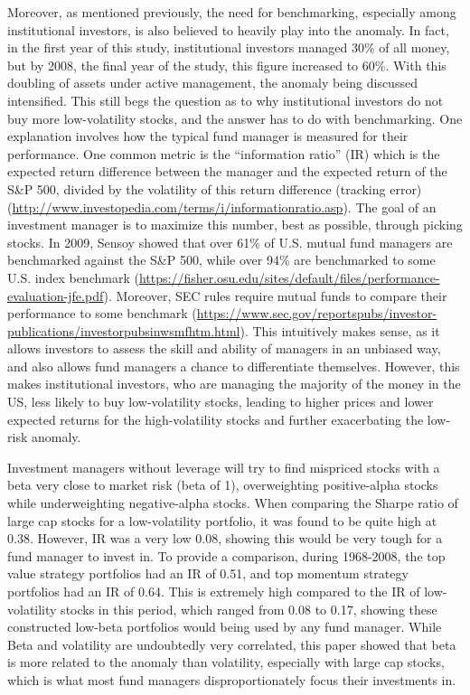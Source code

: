 \documentclass[12pt,twoside]{reedthesis}
\theoremstyle{definition}
\theoremstyle{definition}
\theoremstyle{definition}
\theoremstyle{remark}
\begin{document}
Moreover, as mentioned previously, the need for benchmarking, especially
among institutional investors, is also believed to heavily play into the
anomaly. In fact, in the first year of this study, institutional
investors managed 30\% of all money, but by 2008, the final year of the
study, this figure increased to 60\%. With this doubling of assets under
active management, the anomaly being discussed intensified. This still
begs the question as to why institutional investors do not buy more
low-volatility stocks, and the answer has to do with benchmarking. One
explanation involves how the typical fund manager is measured for their
performance. One common metric is the ``information ratio'' (IR) which
is the expected return difference between the manager and the expected
return of the S\&P 500, divided by the volatility of this return
difference (tracking error)
(\url{http://www.investopedia.com/terms/i/informationratio.asp}). The
goal of an investment manager is to maximize this number, best as
possible, through picking stocks. In 2009, Sensoy showed that over 61\%
of U.S. mutual fund managers are benchmarked against the S\&P 500, while
over 94\% are benchmarked to some U.S. index benchmark
(\url{https://fisher.osu.edu/sites/default/files/performance-evaluation-jfe.pdf}).
Moreover, SEC rules require mutual funds to compare their performance to
some benchmark
(\url{https://www.sec.gov/reportspubs/investor-publications/investorpubsinwsmfhtm.html}).
This intuitively makes sense, as it allows investors to assess the skill
and ability of managers in an unbiased way, and also allows fund
managers a chance to differentiate themselves. However, this makes
institutional investors, who are managing the majority of the money in
the US, less likely to buy low-volatility stocks, leading to higher
prices and lower expected returns for the high-volatility stocks and
further exacerbating the low-risk anomaly.

Investment managers without leverage will try to find mispriced stocks
with a beta very close to market risk (beta of 1), overweighting
positive-alpha stocks while underweighting negative-alpha stocks. When
comparing the Sharpe ratio of large cap stocks for a low-volatility
portfolio, it was found to be quite high at 0.38. However, IR was a very
low 0.08, showing this would be very tough for a fund manager to invest
in. To provide a comparison, during 1968-2008, the top value strategy
portfolios had an IR of 0.51, and top momentum strategy portfolios had
an IR of 0.64. This is extremely high compared to the IR of
low-volatility stocks in this period, which ranged from 0.08 to 0.17,
showing these constructed low-beta portfolios would being used by any
fund manager. While Beta and volatility are undoubtedly very correlated,
this paper showed that beta is more related to the anomaly than
volatility, especially with large cap stocks, which is what most fund
managers disproportionately focus their investments in.
\end{document}

